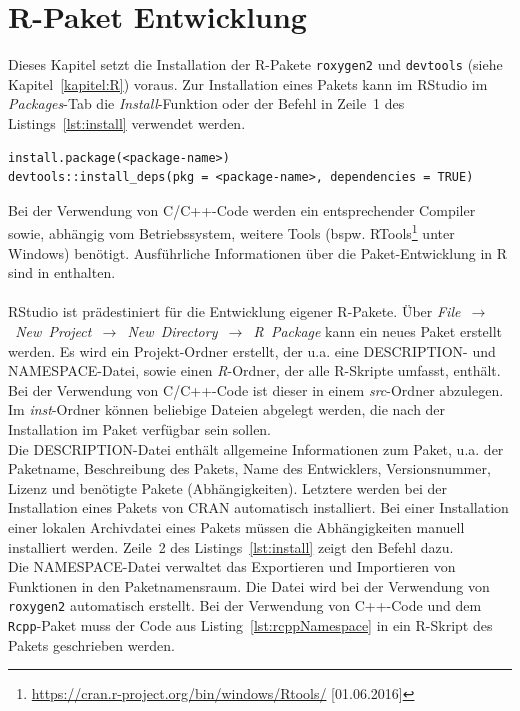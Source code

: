 \section{R-Paket Entwicklung}
\label{kapitel:implementierung_rpaket}
Dieses Kapitel setzt die Installation der R-Pakete \texttt{roxygen2} und \texttt{devtools} (siehe Kapitel~\ref{kapitel:R}) voraus. Zur Installation eines Pakets kann im RStudio im \emph{Packages}-Tab die \emph{Install}-Funktion oder der Befehl in Zeile~1 des Listings~\ref{lst:install} verwendet werden.
\\
\begin{lstlisting}[caption=Installation eines R-Pakets und dessen Abhängigkeiten, label={lst:install}, float=!th]
install.package(<package-name>)
devtools::install_deps(pkg = <package-name>, dependencies = TRUE)
\end{lstlisting}
Bei der Verwendung von C/C++-Code werden ein entsprechender Compiler sowie, abhängig vom Betriebssystem, weitere Tools (bspw. RTools\footnote{\url{https://cran.r-project.org/bin/windows/Rtools/} [01.06.2016]} unter Windows) benötigt. Ausführliche Informationen über die Paket-Entwicklung in R sind in \cite{wickham2015r} enthalten.
\\
\\
RStudio ist prädestiniert für die Entwicklung eigener R-Pakete. Über \emph{File~$\rightarrow$~New~Project~$\rightarrow$~New~Directory~$\rightarrow$~R~Package} kann ein neues Paket erstellt werden. Es wird ein Projekt-Ordner erstellt, der u.a. eine DESCRIPTION- und NAMESPACE-Datei, sowie einen \emph{R}-Ordner, der alle R-Skripte umfasst, enthält. Bei der Verwendung von C/C++-Code ist dieser in einem \emph{src}-Ordner abzulegen. Im \emph{inst}-Ordner können beliebige Dateien abgelegt werden, die nach der Installation im Paket verfügbar sein sollen. \cite[S. 28 ff.]{wickham2015r}
\\
Die DESCRIPTION-Datei enthält allgemeine Informationen zum Paket, u.a. der Paketname, Beschreibung des Pakets, Name des Entwicklers, Versionsnummer, Lizenz und benötigte Pakete (Abhängigkeiten). Letztere werden bei der Installation eines Pakets von CRAN automatisch installiert. Bei einer Installation einer lokalen Archivdatei eines Pakets müssen die Abhängigkeiten manuell installiert werden. Zeile~2 des Listings~\ref{lst:install} zeigt den Befehl dazu. \cite[S. 67 ff.]{wickham2015r}
\\
Die NAMESPACE-Datei verwaltet das Exportieren und Importieren von Funktionen in den Paketnamensraum. Die Datei wird bei der Verwendung von \texttt{roxygen2} automatisch erstellt. Bei der Verwendung von C++-Code und dem \texttt{Rcpp}-Paket muss der Code aus Listing~\ref{lst:rcppNamespace} in ein R-Skript des Pakets geschrieben werden. \cite[S. 144 ff.]{wickham2015r}
